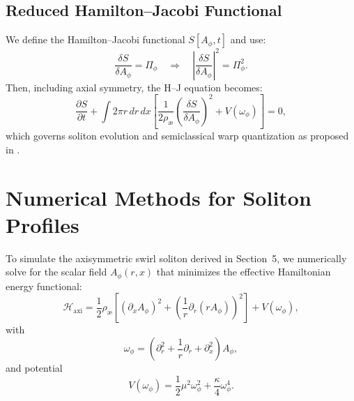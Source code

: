 \documentclass[preprint,notitlepage]{revtex4-2}
\begin{document}
        \subsection*{Reduced Hamilton–Jacobi Functional}
        We define the Hamilton–Jacobi functional $S[A_\phi, t]$ and use:
        \begin{equation}
          \frac{\delta S}{\delta A_\phi} = \Pi_\phi \quad \Rightarrow \quad \left|\frac{\delta S}{\delta A_\phi}\right|^2 = \Pi_\phi^2.
        \end{equation}
        Then, including axial symmetry, the H–J equation becomes:
        \begin{equation}
          \frac{\partial S}{\partial t} + \int 2\pi r \,dr\,dx \left[ \frac{1}{2\rho_{æ}} \left( \frac{\delta S}{\delta A_\phi} \right)^2 + V(\omega_\phi) \right] = 0,
        \end{equation}
        which governs soliton evolution and semiclassical warp quantization as proposed in \cite{VAM4}.

    \section{Numerical Methods for Soliton Profiles}\label{sec:numerical_methods}

        To simulate the axisymmetric swirl soliton derived in Section~5, we numerically solve for the scalar field $A_\phi(r,x)$ that minimizes the effective Hamiltonian energy functional:
        \begin{equation}
            \mathcal{H}_{\text{axi}} = \frac{1}{2} \rho_{\text{\ae}} \left[ (\partial_x A_\phi)^2 + \left( \frac{1}{r} \partial_r(r A_\phi) \right)^2 \right] + V(\omega_\phi),
        \end{equation}
        with
        \begin{equation}
            \omega_\phi = \left( \partial_r^2 + \frac{1}{r} \partial_r + \partial_x^2 \right) A_\phi,
        \end{equation}
        and potential
        \begin{equation}
            V(\omega_\phi) = \frac{1}{2} \mu^2 \omega_\phi^2 + \frac{\kappa}{4} \omega_\phi^4.
        \end{equation}
\end{document}
